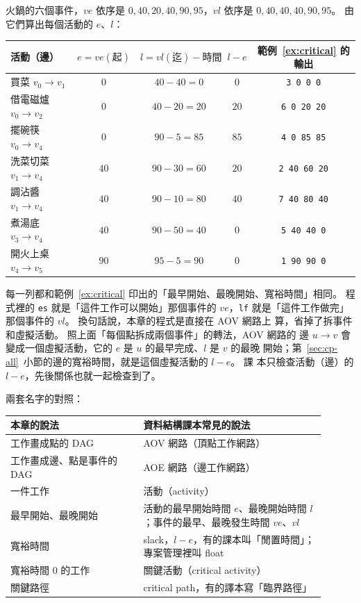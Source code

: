 火鍋的六個事件，$ve$ 依序是 $0, 40, 20, 40, 90, 95$，$vl$ 依序是
$0, 40, 40, 40, 90, 95$。 由它們算出每個活動的 $e$、$l$：

\begin{center}
\begin{tabular}{lcccc}
\toprule
活動（邊） & $e = ve(\text{起})$ & $l = vl(\text{迄}) - \text{時間}$ & $l - e$ & 範例~\ref{ex:critical} 的輸出 \\
\midrule
買菜 $v_0 \to v_1$ & $0$ & $40 - 40 = 0$ & $0$ & \texttt{3 0 0 0} \\
借電磁爐 $v_0 \to v_2$ & $0$ & $40 - 20 = 20$ & $20$ & \texttt{6 0 20 20} \\
擺碗筷 $v_0 \to v_4$ & $0$ & $90 - 5 = 85$ & $85$ & \texttt{4 0 85 85} \\
洗菜切菜 $v_1 \to v_4$ & $40$ & $90 - 30 = 60$ & $20$ & \texttt{2 40 60 20} \\
調沾醬 $v_1 \to v_4$ & $40$ & $90 - 10 = 80$ & $40$ & \texttt{7 40 80 40} \\
煮湯底 $v_3 \to v_4$ & $40$ & $90 - 50 = 40$ & $0$ & \texttt{5 40 40 0} \\
開火上桌 $v_4 \to v_5$ & $90$ & $95 - 5 = 90$ & $0$ & \texttt{1 90 90 0} \\
\bottomrule
\end{tabular}
\end{center}

每一列都和範例~\ref{ex:critical} 印出的「最早開始、最晚開始、寬裕時間」相同。
程式裡的 \texttt{es} 就是「這件工作可以開始」那個事件的 $ve$，\texttt{lf}
就是「這件工作做完」那個事件的 $vl$。 換句話說，本章的程式是直接在 AOV 網路上
算，省掉了拆事件和虛擬活動。 照上面「每個點拆成兩個事件」的轉法，AOV 網路的
邊 $u \to v$ 會變成一個虛擬活動，它的 $e$ 是 $u$ 的最早完成、$l$ 是 $v$ 的最晚
開始；第~\ref{sec:cp-all}~小節的邊的寬裕時間，就是這個虛擬活動的 $l - e$。 課
本只檢查活動（邊）的 $l - e$，先後關係也就一起檢查到了。

兩套名字的對照：

\begin{center}
\begin{tabular}{p{0.38\linewidth}p{0.52\linewidth}}
\toprule
本章的說法 & 資料結構課本常見的說法 \\
\midrule
工作畫成點的 DAG & AOV 網路（頂點工作網路） \\
工作畫成邊、點是事件的 DAG & AOE 網路（邊工作網路） \\
一件工作 & 活動（activity） \\
最早開始、最晚開始 & 活動的最早開始時間 $e$、最晚開始時間 $l$；事件的最早、最晚發生時間 $ve$、$vl$ \\
寬裕時間 & slack，$l - e$，有的課本叫「閒置時間」；專案管理裡叫 float \\
寬裕時間 $0$ 的工作 & 關鍵活動（critical activity） \\
關鍵路徑 & critical path，有的譯本寫「臨界路徑」 \\
\bottomrule
\end{tabular}
\end{center}

